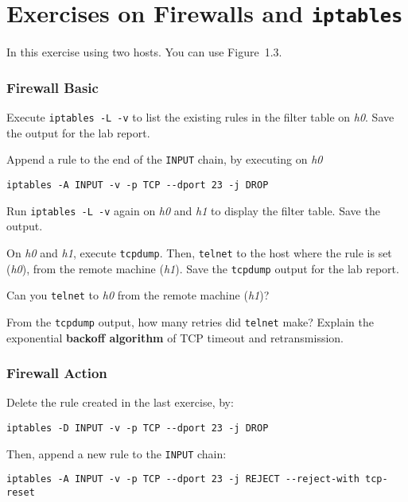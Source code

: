\documentclass{../UTNetLab}
\begin{document}
\part{Exercises on Firewalls and \texttt{iptables}}
    In this exercise using two hosts.
    You can use Figure~1.3.

\section{Firewall Basic}
    Execute \lstinline{iptables -L -v} to list the existing rules in the filter table on \textit{h0}.
    Save the output for the lab report.

    Append a rule to the end of the \texttt{INPUT} chain, by executing on \textit{h0}
    \begin{lstlisting}
iptables -A INPUT -v -p TCP --dport 23 -j DROP
    \end{lstlisting}
    
    Run \lstinline{iptables -L -v} again on \textit{h0} and \textit{h1} to display the filter table.
    Save the output.

    On \textit{h0} and \textit{h1}, execute \lstinline{tcpdump}.
    Then, \lstinline{telnet} to the host where the rule is set (\textit{h0}), from the remote machine (\textit{h1}).
    Save the \lstinline{tcpdump} output for the lab report.

    \begin{report}
    \item Can you \lstinline{telnet} to \textit{h0} from the remote machine (\textit{h1})?
    
    \item From the \lstinline{tcpdump} output, how many retries did \lstinline{telnet} make? Explain the exponential \textbf{backoff algorithm} of TCP timeout and retransmission.
    \end{report}
    
\section{Firewall Action}
    Delete the rule created in the last exercise, by:    
    \begin{lstlisting}
iptables -D INPUT -v -p TCP --dport 23 -j DROP
    \end{lstlisting}
    
    Then, append a new rule to the \texttt{INPUT} chain:    
    \begin{lstlisting}
iptables -A INPUT -v -p TCP --dport 23 -j REJECT --reject-with tcp-reset
    \end{lstlisting}
    
\end{document}
